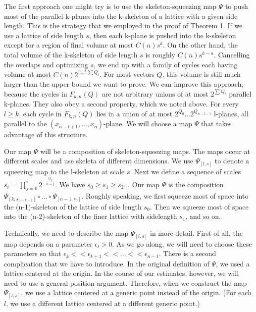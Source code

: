 \documentclass{amsart}
\newtheorem*{Theorem 1}{Theorem 1}
\newtheorem*{Theorem 2}{Theorem 2}
\newtheorem*{Theorem 1A}{Theorem 1A}
\newtheorem*{Theorem 2A}{Theorem 2A}
\newtheorem*{vanishing lemma}{Vanishing Lemma}
\numberwithin{equation}{section}
\begin{document}
The first approach one might try is to use the skeleton-squeezing map $\Psi$ to
push most of the parallel k-planes into the k-skeleton of a lattice with a given
side length.  This is the strategy that we employed in the proof of Theorem 1.
If we use a lattice of side length $s$, then each k-plane is pushed into the
k-skeleton except for a region of final volume at most $C(n) s^k$.  On the other
hand, the total volume of the k-skeleton of side length $s$ is roughly $C(n) s^{k-n}$.
Cancelling the overlaps and optimizing $s$, we end up with a family of cycles
each having volume at most $C(n) 2^{\frac{n-k}{n} \sum Q_i}$.  For most vectors
$Q$, this volume is still much larger than the upper bound we want to prove.
We can improve this approach, because the cycles in $F_{k,n}(Q)$ are not
arbitrary unions of at most $2^{\sum Q_i}$ parallel k-planes.  They also obey
a second property, which we noted above.  For
every $l \ge k$, each cycle in $F_{k,n}(Q)$ lies in a union of at most 
$2^{Q_0} ... 2^{Q_{n-l-1}}$ l-planes, all parallel to the $(x_{n-l+1}, ..., x_n)$-plane.
We will choose a map $\Psi$ that takes advantage of this structure.

Our map $\Psi$ will be a composition of skeleton-squeezing
maps.  The maps occur at different scales and use skeleta of
different dimensions.  We use $\Psi_{[l,s]}$ to denote a squeezing map
to the l-skeleton at scale $s$.  Next we define a sequence of
scales $s_i = \prod_{j=0}^i 2^{- \frac{Q_j}{n-j}}$.  We have $s_0 \ge s_1
\ge s_2 ...$  Our map $\Psi$ is the composition 
$\Psi_{[k, s_{n-k-1}]} \circ ... \circ \Psi_{[n-1, s_0]}$.
Roughly speaking, we first squeeze most of space into 
the (n-1)-skeleton of the lattice
of side length $s_0$.  Then we squeeze most of space into 
the (n-2)-skeleton of the finer
lattice with sidelength $s_1$, and so on.  

Technically, we need to describe the map $\Psi_{[l,s]}$ in more
detail.  First of all, the map depends on a parameter $\epsilon_l > 0$.
As we go along, we will need to choose these parameters so that
$\epsilon_k << \epsilon_{k+1} << ... << \epsilon_{n-1}$.  There is a
second complication that we have to introduce.  In the original definition
of $\Psi$, we used a lattice centered at the origin.  In the course of
our estimates, however, we will need to use a general position
argument.  Therefore, when we construct the map $\Psi_{[l,s]}$, we use
a lattice centered at a generic point instead of the origin.  (For each
$l$, we use a different lattice centered at a different generic point.)
\end{document}
